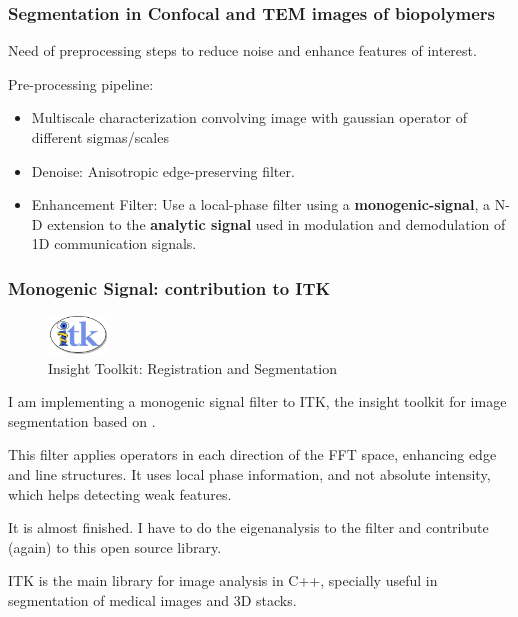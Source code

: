 \documentclass[9pt]{beamer}
\begin{document}
\begin{frame}[t]
  \frametitle{Segmentation in Confocal and TEM images of biopolymers}
     Need of preprocessing steps to reduce noise and enhance features of interest.
     \begin{exampleblock}{Pre-processing pipeline:}
     \begin{itemize}
       \item Multiscale characterization convolving image with gaussian operator of different sigmas/scales
       \item Denoise: Anisotropic edge-preserving filter.
       \item Enhancement Filter: Use a local-phase filter using a \textbf{monogenic-signal}, a N-D extension to the \textbf{analytic signal} used in modulation and demodulation of 1D communication signals.
     \end{itemize}
     \end{exampleblock}
\end{frame}

\begin{frame}[t]
  \frametitle{Monogenic Signal: contribution to ITK}
    \begin{figure}[h]
      \centering
      \includegraphics[height=1cm]{./Figures/software_logos/itkLogo.png}
      \caption*{Insight Toolkit: Registration and Segmentation}
    \end{figure}
    I am implementing a monogenic signal filter to ITK, the insight toolkit for image segmentation based on \citep{chenouard_3d_2011}.

    This filter applies operators in each direction of the FFT space, enhancing edge and line structures.
    It uses local phase information, and not absolute intensity, which helps detecting weak features.

    It is almost finished. I have to do the eigenanalysis to the filter and contribute (again) to this open source library.

    ITK is the main library for image analysis in C++, specially useful in segmentation of medical images and 3D stacks.
\end{frame}
\end{document}
